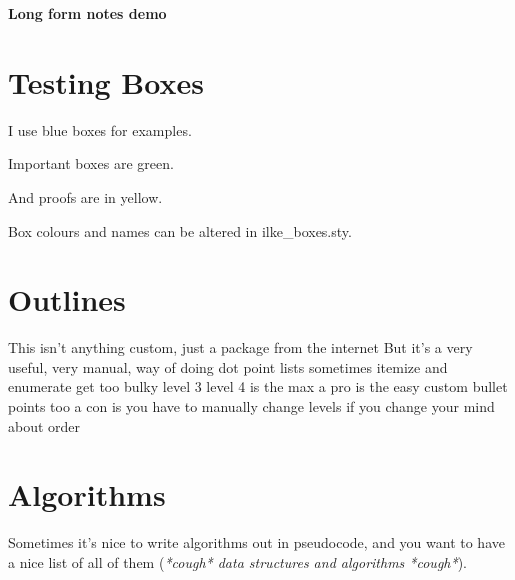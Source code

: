 \documentclass[11pt]{article}
\title{}
\author{Ilke Dincer}
\date{}
\begin{document}
\begin{center}
    \LARGE
    \textbf{Long form notes demo}
\end{center}

\tableofcontents \label{toc}


\pagebreak
{}
\section{Testing Boxes}

\begin{example-box}
  I use blue boxes for examples. 
\end{example-box}


\begin{important-box}
Important boxes are green. 
\end{important-box}

\begin{proof-box}
  And proofs are in yellow. 
\end{proof-box}

Box colours and names can be altered in ilke\_boxes.sty. 


\section{Outlines}

\begin{outline}
\0 This isn't anything custom, just a package from the internet
  \1 But it's a very useful, very manual, way of doing dot point lists
    \2 sometimes itemize and enumerate get too bulky
      \3 level 3
        \4 level 4 is the max
  \1[+] a pro is the easy custom bullet points too
  \1[-] a con is you have to manually change levels if you change your mind about order
\end{outline}


\section{Algorithms}
Sometimes it's nice to write algorithms out in pseudocode, and you want to have a nice list of all of them (\textit{*cough* data structures and algorithms *cough*}). 
\end{document}
